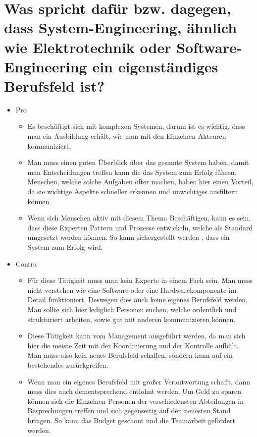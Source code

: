 \documentclass[12pt]{article}
\begin{document}
\section{Was spricht dafür bzw. dagegen, dass System-Engineering, ähnlich wie Elektrotechnik oder Software-
Engineering ein eigenständiges Berufsfeld ist?}
\begin{itemize}
 \item Pro
 \begin{itemize}
  \item Es beschäftigt sich mit komplexen Systemen, darum ist es wichtig, dass man ein Ausbildung erhält, wie man mit den Einzelnen Akteuren kommuniziert.
  \item Man muss einen guten Überblick über das gesamte System haben, damit man Entscheidungen treffen kann die das System zum Erfolg führen. Menschen, welche solche Aufgaben öfter machen, haben hier einen Vorteil, da sie wichtige Aspekte schneller erkennen und unwichtiges ausfiltern können
  \item Wenn sich Menschen aktiv mit diesem Thema Beschäftigen, kann es sein, dass diese Experten Pattern und Prozesse entwickeln, welche als Standard umgesetzt werden können. So kann sichergestellt werden , dass ein System zum Erfolg wird.
 \end{itemize}
 \item Contra
 \begin{itemize}
  \item Für diese Tätigkeit muss man kein Experte in einem Fach sein. Man muss nicht verstehen wie eine Software oder eine Hardwarekomponente im Detail funktioniert. Deswegen dies auch keine eigenes Berufsfeld werden. Man sollte sich hier lediglich Personen suchen, welche ordentlich und strukturiert arbeiten, sowie gut mit anderen kommunizieren können.
  \item Diese Tätigkeit kann vom Management ausgeführt werden, da man sich hier die meiste Zeit mit der Koordinierung und der Kontrolle aufhält. Man muss also kein neues Berufsfeld schaffen, sondern kann auf ein bestehendes zurückgreifen.
  \item Wenn man ein eigenes Berufsfeld mit großer Verantwortung schafft, dann muss dies auch dementsprechend entlohnt werden. Um Geld zu sparen können sich die Einzelnen Personen der verschiedensten Abteilungen in Besprechungen treffen und sich gegenseitig auf den neuesten Stand bringen. So kann das Budget geschont und die Teamarbeit gefördert werden.
 \end{itemize}
\end{itemize}

\vfill
\printbibliography
\end{document}
